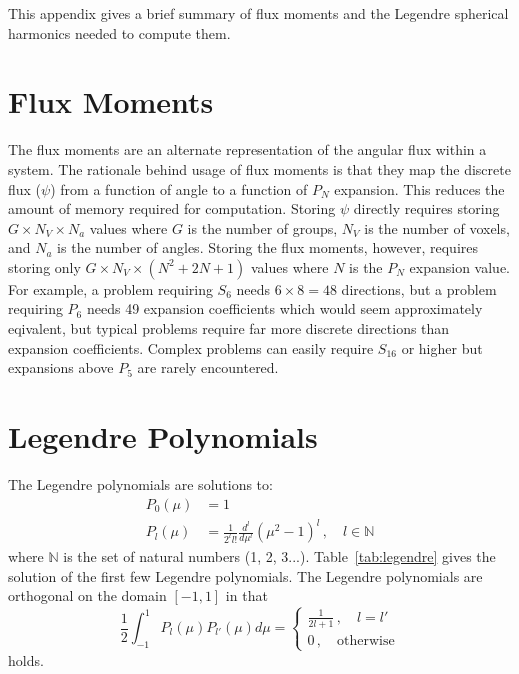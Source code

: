 
This appendix gives a brief summary of flux moments and the Legendre spherical harmonics needed to compute them.

\section{Flux Moments}\label{appdx:moments}

The flux moments are an alternate representation of the angular flux  within a system. The rationale behind usage of flux moments is that they map the discrete flux ($\psi$) from a function of angle to a function of $P_N$ expansion. This reduces the amount of memory required for computation. Storing $\psi$ directly requires storing $G \times N_V \times N_a$ values where $G$ is the number of groups, $N_V$ is the number of voxels, and $N_a$ is the number of angles. Storing the flux moments, however, requires storing only $G \times N_V \times (N^2 + 2N + 1)$ values where $N$ is the $P_N$ expansion value. For example, a problem requiring $S_6$ needs $6 \times 8 = 48$ directions, but a problem requiring $P_6$ needs 49 expansion coefficients which would seem approximately eqivalent, but typical problems require far more discrete directions than expansion coefficients. Complex problems can easily require $S_{16}$ or higher but expansions above $P_5$ are rarely encountered.

\section{Legendre Polynomials}\label{appdx:leg}

The Legendre polynomials are solutions to:
\begin{equation}
\begin{split}
P_0(\mu) &= 1 \\
P_l(\mu) &= \frac{1}{2^l l!} \frac{d^l}{d\mu^l}(\mu^2 - 1)^l \,, \quad l \in \mathbb{N}
\end{split}
\end{equation}
where $\mathbb{N}$ is the set of natural numbers (1, 2, 3...). Table~\ref{tab:legendre} gives the solution of the first few Legendre polynomials. The Legendre polynomials are orthogonal on the domain $[-1, 1]$ in that
\begin{equation}
\frac{1}{2} \int_{-1}^{1} P_l(\mu) P_{l'}(\mu) d\mu = 
\begin{cases}
\frac{1}{2l+1} \,, \quad l = l'\\
0 \,, \quad \text{otherwise}
\end{cases}
\end{equation}
holds.

